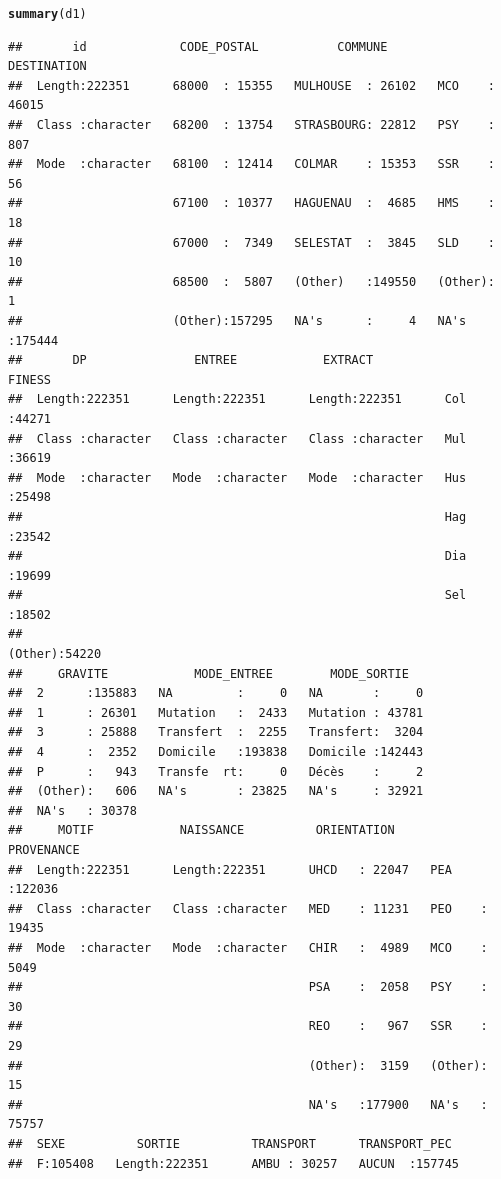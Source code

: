 \documentclass[12pt,english,french,twoside]{report}\usepackage[]{graphicx}\usepackage[]{color}
\makeatletter
\newcommand{\hlkwd}[1]{\textcolor[rgb]{0.737,0.353,0.396}{\textbf{#1}}}%
\newenvironment{kframe}{%
 \def\at@end@of@kframe{}%
 \ifinner\ifhmode%
  \def\at@end@of@kframe{\end{minipage}}%
  \begin{minipage}{\columnwidth}%
 \fi\fi%
 \def\FrameCommand##1{\hskip\@totalleftmargin \hskip-\fboxsep
 \colorbox{shadecolor}{##1}\hskip-\fboxsep
     \hskip-\linewidth \hskip-\@totalleftmargin \hskip\columnwidth}%
 \MakeFramed {\advance\hsize-\width
   \@totalleftmargin\z@ \linewidth\hsize
   \@setminipage}}%
 {\par\unskip\endMakeFramed%
 \at@end@of@kframe}
\newenvironment{knitrout}{}{} %
\makeatother
\begin{document}
\begin{knitrout}
\begin{kframe}
\begin{alltt}
\hlkwd{summary}(d1)
\end{alltt}
\begin{verbatim}
##       id             CODE_POSTAL           COMMUNE        DESTINATION    
##  Length:222351      68000  : 15355   MULHOUSE  : 26102   MCO    : 46015  
##  Class :character   68200  : 13754   STRASBOURG: 22812   PSY    :   807  
##  Mode  :character   68100  : 12414   COLMAR    : 15353   SSR    :    56  
##                     67100  : 10377   HAGUENAU  :  4685   HMS    :    18  
##                     67000  :  7349   SELESTAT  :  3845   SLD    :    10  
##                     68500  :  5807   (Other)   :149550   (Other):     1  
##                     (Other):157295   NA's      :     4   NA's   :175444  
##       DP               ENTREE            EXTRACT              FINESS     
##  Length:222351      Length:222351      Length:222351      Col    :44271  
##  Class :character   Class :character   Class :character   Mul    :36619  
##  Mode  :character   Mode  :character   Mode  :character   Hus    :25498  
##                                                           Hag    :23542  
##                                                           Dia    :19699  
##                                                           Sel    :18502  
##                                                           (Other):54220  
##     GRAVITE            MODE_ENTREE        MODE_SORTIE    
##  2      :135883   NA         :     0   NA       :     0  
##  1      : 26301   Mutation   :  2433   Mutation : 43781  
##  3      : 25888   Transfert  :  2255   Transfert:  3204  
##  4      :  2352   Domicile   :193838   Domicile :142443  
##  P      :   943   Transfe  rt:     0   Décès    :     2  
##  (Other):   606   NA's       : 23825   NA's     : 32921  
##  NA's   : 30378                                          
##     MOTIF            NAISSANCE          ORIENTATION       PROVENANCE    
##  Length:222351      Length:222351      UHCD   : 22047   PEA    :122036  
##  Class :character   Class :character   MED    : 11231   PEO    : 19435  
##  Mode  :character   Mode  :character   CHIR   :  4989   MCO    :  5049  
##                                        PSA    :  2058   PSY    :    30  
##                                        REO    :   967   SSR    :    29  
##                                        (Other):  3159   (Other):    15  
##                                        NA's   :177900   NA's   : 75757  
##  SEXE          SORTIE          TRANSPORT      TRANSPORT_PEC   
##  F:105408   Length:222351      AMBU : 30257   AUCUN  :157745  

\end{verbatim}
\end{kframe}
\end{knitrout}
\end{document}
